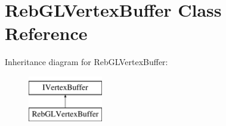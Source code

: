 \hypertarget{class_reb_g_l_vertex_buffer}{}\section{Reb\+G\+L\+Vertex\+Buffer Class Reference}
\label{class_reb_g_l_vertex_buffer}
Inheritance diagram for Reb\+G\+L\+Vertex\+Buffer\+:\begin{figure}[H]
\begin{center}
\leavevmode
\includegraphics[height=2.000000cm]{class_reb_g_l_vertex_buffer}
\end{center}
\end{figure}
